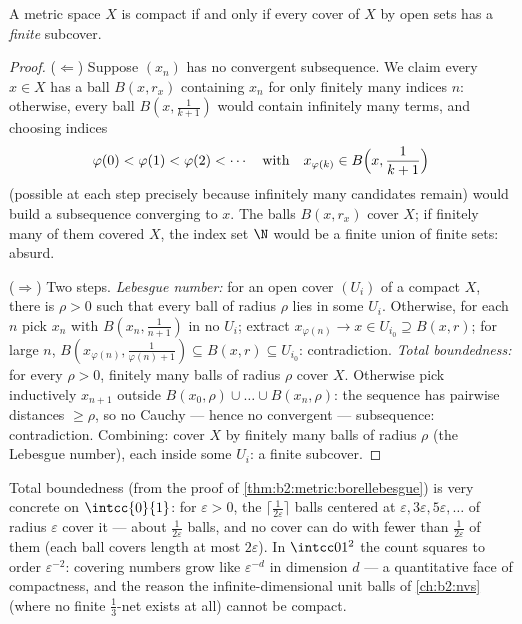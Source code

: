 \begin{theorem}\label{thm:b2:metric:borellebesgue}
A metric space $X$ is compact if and only if every cover of $X$ by
open sets has a \emph{finite} subcover.
\end{theorem}

\begin{proof}
($\Leftarrow$) Suppose $(x_n)$ has no convergent subsequence. We
claim every $x \in X$ has a ball $B(x, r_x)$ containing $x_n$
for only finitely many indices $n$: otherwise, every ball
$B(x, \frac1{k+1})$ would contain infinitely many terms, and
choosing indices
\[
\varphi(0) < \varphi(1) < \varphi(2) < \cdots
\quad\text{with}\quad
x_{\varphi(k)} \in B\Bigl(x, \frac{1}{k+1}\Bigr)
\]
(possible at each step precisely because infinitely many
candidates remain) would build a subsequence converging to $x$.
The balls $B(x, r_x)$ cover $X$; if finitely many of them
covered $X$, the index set $\N$ would be a finite union of
finite sets: absurd.

($\Rightarrow$) Two steps. \emph{Lebesgue number:} for an open cover
$(U_i)$ of a compact $X$, there is $\rho > 0$ such that every ball
of radius $\rho$ lies in some $U_i$. Otherwise, for each $n$ pick
$x_n$ with $B(x_n, \frac{1}{n+1})$ in no $U_i$; extract
$x_{\varphi(n)} \to x \in U_{i_0} \supseteq B(x, r)$; for large $n$,
$B(x_{\varphi(n)}, \frac{1}{\varphi(n)+1}) \subseteq B(x, r)
\subseteq U_{i_0}$: contradiction. \emph{Total boundedness:} for
every $\rho > 0$, finitely many balls of radius $\rho$ cover $X$.
Otherwise pick inductively $x_{n+1}$ outside $B(x_0, \rho) \cup
\dots \cup B(x_n, \rho)$: the sequence has pairwise distances $\geq
\rho$, so no Cauchy --- hence no convergent --- subsequence:
contradiction. Combining: cover $X$ by finitely many balls of radius
$\rho$ (the Lebesgue number), each inside some $U_i$: a finite
subcover.
\end{proof}

\begin{example}\label{ex:b2:metric:epsnet}
Total boundedness (from the proof of
\cref{thm:b2:metric:borellebesgue}) is very concrete on
$\intcc{0}{1}$: for $\varepsilon > 0$, the $\lceil
\frac{1}{2\varepsilon}\rceil$ balls centered at $\varepsilon,
3\varepsilon, 5\varepsilon, \dots$ of radius $\varepsilon$
cover it --- about $\frac1{2\varepsilon}$ balls, and no cover
can do with fewer than $\frac{1}{2\varepsilon}$ of them (each
ball covers length at most $2\varepsilon$). In $\intcc01^2$
the count squares to order $\varepsilon^{-2}$: covering numbers
grow like $\varepsilon^{-d}$ in dimension $d$ --- a quantitative
face of compactness, and the reason the infinite-dimensional
unit balls of \cref{ch:b2:nvs} (where no finite
$\frac13$-net exists at all) cannot be compact.
\end{example}

